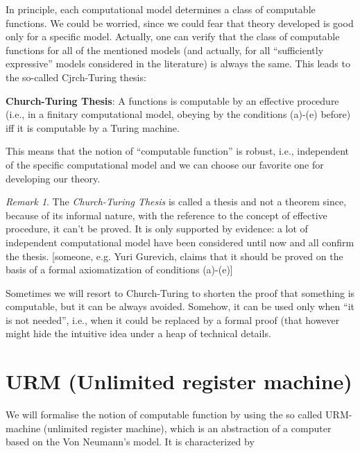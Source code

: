 \documentclass{amsbook}
\theoremstyle{definition}
\theoremstyle{remark}
\newtheorem{remark}[theorem]{Remark}
\numberwithin{section}{chapter}
\numberwithin{equation}{chapter}
\begin{document}
In principle, each computational model determines a class of
computable functions. We could be worried, since we could fear that
theory developed is good only for a specific model. Actually, one can
verify that the class of computable functions for all of the mentioned
models (and actually, for all ``sufficiently expressive'' models
considered in the literature) is always the same.
This leads to the so-called Cjrch-Turing thesis:

\textbf{Church-Turing Thesis}: A functions is computable by an
effective procedure (i.e., in a finitary computational model, obeying by the conditions (a)-(e) before) iff it is computable
by a Turing machine.


This means that the notion of ``computable function'' is robust, i.e., independent of the specific computational model and we can choose our favorite one for developing our theory.

\begin{remark}
  The \emph{Church-Turing Thesis} is called a thesis and not a theorem
  since, because of its informal nature, with the reference to the
  concept of effective procedure, it can't be proved. It is only
  supported by evidence: a lot of independent computational model have
  been considered until now and all confirm the thesis. [someone,
  e.g. Yuri Gurevich, claims that it should be proved on the basis of
  a formal axiomatization of conditions (a)-(e)]
\end{remark}

Sometimes we will resort to Church-Turing to shorten the proof that something is computable, but it can be always avoided. Somehow, it can be used only when ``it is not needed'', i.e.,  when it could be replaced by a formal proof (that however might hide the intuitive idea under a heap of technical details.


\section{URM (Unlimited register machine)}

We will formalise the notion of computable function by using the so called URM-machine (unlimited register machine), which is an abstraction of a computer based on the Von Neumann's model. It is characterized by
\end{document}

